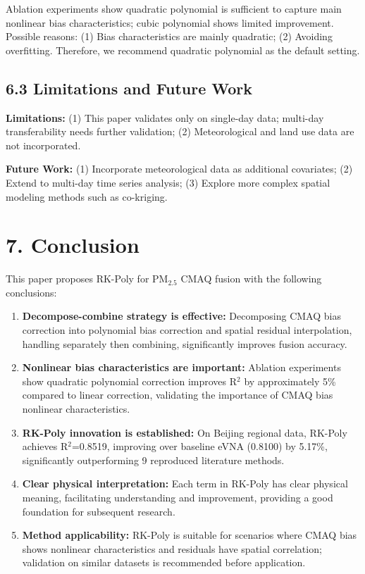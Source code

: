 \documentclass[a4paper]{article}
\begin{document}
Ablation experiments show quadratic polynomial is sufficient to capture main nonlinear bias characteristics; cubic polynomial shows limited improvement. Possible reasons: (1) Bias characteristics are mainly quadratic; (2) Avoiding overfitting. Therefore, we recommend quadratic polynomial as the default setting.

\subsection{6.3 Limitations and Future Work}

\textbf{Limitations:} (1) This paper validates only on single-day data; multi-day transferability needs further validation; (2) Meteorological and land use data are not incorporated.

\textbf{Future Work:} (1) Incorporate meteorological data as additional covariates; (2) Extend to multi-day time series analysis; (3) Explore more complex spatial modeling methods such as co-kriging.

\section{7. Conclusion}

This paper proposes RK-Poly for PM$_{2.5}$ CMAQ fusion with the following conclusions:

\begin{enumerate}
    \item \textbf{Decompose-combine strategy is effective:} Decomposing CMAQ bias correction into polynomial bias correction and spatial residual interpolation, handling separately then combining, significantly improves fusion accuracy.

    \item \textbf{Nonlinear bias characteristics are important:} Ablation experiments show quadratic polynomial correction improves R$^2$ by approximately 5\% compared to linear correction, validating the importance of CMAQ bias nonlinear characteristics.

    \item \textbf{RK-Poly innovation is established:} On Beijing regional data, RK-Poly achieves R$^2$=0.8519, improving over baseline eVNA (0.8100) by 5.17\%, significantly outperforming 9 reproduced literature methods.

    \item \textbf{Clear physical interpretation:} Each term in RK-Poly has clear physical meaning, facilitating understanding and improvement, providing a good foundation for subsequent research.

    \item \textbf{Method applicability:} RK-Poly is suitable for scenarios where CMAQ bias shows nonlinear characteristics and residuals have spatial correlation; validation on similar datasets is recommended before application.
\end{enumerate}
\end{document}
